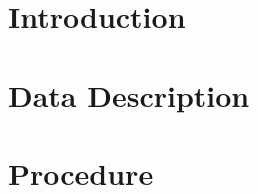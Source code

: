 \documentclass[12pt,a4paper]{report}
\begin{document}
\tableofcontents

\newpage

\listoffigures

\newpage

\section{Introduction}



\newpage

\section{Data Description}



\newpage

\section{Procedure}


\end{document}
